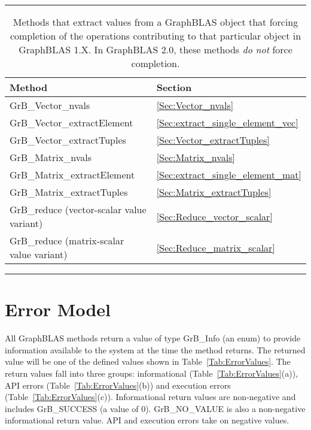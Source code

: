 \begin{table}[htb]
    \hrule
    \begin{center}
        \caption{Methods that extract values from a GraphBLAS object that 
        forcing completion of the operations contributing to that particular object in GraphBLAS 1.X. 
        In GraphBLAS 2.0, these methods \emph{do not} force completion.}
        \label{Tab:ExtractMethods}

        \begin{tabular}{l|l}
            Method    					& Section 				\\ \hline

            {\sf GrB\_Vector\_nvals}        		& \ref{Sec:Vector_nvals}        	\\
            {\sf GrB\_Vector\_extractElement}     	& \ref{Sec:extract_single_element_vec}  \\
            {\sf GrB\_Vector\_extractTuples}    	& \ref{Sec:Vector_extractTuples}    	\\
            {\sf GrB\_Matrix\_nvals}        		& \ref{Sec:Matrix_nvals}        	\\
            {\sf GrB\_Matrix\_extractElement}     	& \ref{Sec:extract_single_element_mat}  \\
            {\sf GrB\_Matrix\_extractTuples}    	& \ref{Sec:Matrix_extractTuples}    	\\
            {\sf GrB\_reduce} (vector-scalar value variant)   & \ref{Sec:Reduce_vector_scalar}        \\
            {\sf GrB\_reduce} (matrix-scalar value variant)   & \ref{Sec:Reduce_matrix_scalar}        \\
        \end{tabular}
    \end{center}
    \hrule
\end{table}




\section{Error Model}
\label{Sec:ErrorModel}

All GraphBLAS methods return a value of type {\sf GrB\_Info} (an enum) to provide
information available to the system at the time the method returns. The
returned value will be one of the defined values shown in 
Table~\ref{Tab:ErrorValues}. The return values fall into three groups: 
informational (Table~\ref{Tab:ErrorValues}(a)), API errors 
(Table~\ref{Tab:ErrorValues}(b)) and execution errors 
(Table~\ref{Tab:ErrorValues}(c)).  Informational return values are 
non-negative and includes {\sf GrB\_SUCCESS} (a value of 0).  {\sf GrB\_NO\_VALUE} 
is also a non-negative informational return value.  API and execution errors
take on negative values.

